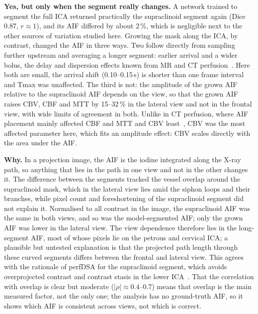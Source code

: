 \textbf{Yes, but only when the segment really changes.} A network trained to segment the full ICA returned
practically the supraclinoid segment again (Dice 0.87, $r \approx 1$), and its AIF differed by about 2\,\%, which
is negligible next to the other sources of variation studied here. Growing the mask along the ICA, by contrast,
changed the AIF in three ways. Two follow directly from sampling further upstream and averaging a longer
segment: earlier arrival and a wider bolus, the delay and dispersion effects known from MR and CT
perfusion~\cite{calamante2000,calamante2013}. Here both are small, the arrival shift (0.10--0.15\,s) is shorter
than one frame interval and Tmax was unaffected. The third is not: the amplitude of the grown AIF relative to
the supraclinoid AIF depends on the view, so that the grown AIF raises CBV, CBF and MTT by 15--32\,\% in the
lateral view and not in the frontal view, with wide limits of agreement in both. Unlike in CT perfusion, where
AIF placement mainly affected CBF and MTT and CBV least~\cite{ferreira2010}, CBV was the most affected
parameter here, which fits an amplitude effect: CBV scales directly with the area under the AIF.

\textbf{Why.} In a projection image, the AIF is the iodine integrated along the X-ray path, so anything that lies
in the path in one view and not in the other changes it. The difference between the segments tracked the vessel
overlap around the supraclinoid mask, which in the lateral view lies amid the siphon loops and their branches,
while pixel count and foreshortening of the supraclinoid segment did not explain it. Normalised to all contrast
in the image, the supraclinoid AIF was the same in both views, and so was the model-segmented AIF; only the
grown AIF was lower in the lateral view. The view dependence therefore lies in the long-segment AIF, most of
whose pixels lie on the petrous and cervical ICA; a plausible but untested explanation is that the projected
path length through these curved segments differs between the frontal and lateral view. This agrees with the rationale of perfDSA for the supraclinoid
segment, which avoids overprojected contrast and contrast stasis in the lower ICA~\cite{su2025perfdsa}. That the
correlation with overlap is clear but moderate ($|\rho| \approx 0.4$--$0.7$) means that overlap is the main
measured factor, not the only one; the analysis has no ground-truth AIF, so it shows which AIF is consistent
across views, not which is correct.

